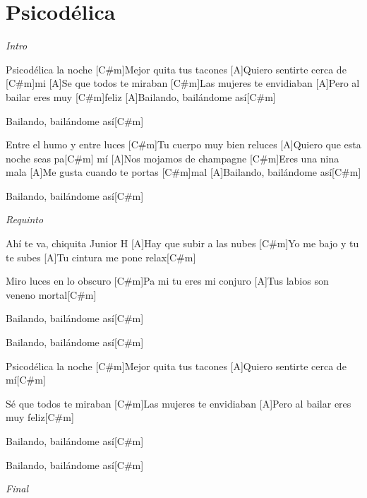 \section{Psicod\'elica}

\noindent
\vspace{1cm}

\begin{guitar}
	\begin{multicols}{2}
		\textit{Intro} \par
		[A]Psicodélica la noche
		[C#m]Mejor quita tus tacones
		[A]Quiero sentirte cerca de [C#m]mi
		[A]Se que todos te miraban
		[C#m]Las mujeres te envidiaban
		[A]Pero al bailar eres muy [C#m]feliz
		[A]Bailando, bailándome así[C#m] \par
		[A]Bailando, bailándome así[C#m] \par
		[A]Entre el humo y entre luces
		[C#m]Tu cuerpo muy bien reluces
		[A]Quiero que esta noche seas pa[C#m] mí
		[A]Nos mojamos de champagne
		[C#m]Eres una nina mala
		[A]Me gusta cuando te portas [C#m]mal
		[A]Bailando, bailándome así[C#m] \par
		[Bm]Bailando, bailándome así[C#m] \par
		\par
		\textit{Requinto}

		Ahí te va, chiquita
		Junior H
		[A]Hay que subir a las nubes
		[C#m]Yo me bajo y tu te subes
		[A]Tu cintura me pone relax[C#m] \par
		[A]Miro luces en lo obscuro
		[C#m]Pa mi tu eres mi conjuro
		[A]Tus labios son veneno mortal[C#m] \par
		[A]Bailando, bailándome así[C#m] \par
		[A]Bailando, bailándome así[C#m] \par
		[A]Psicodélica la noche
		[C#m]Mejor quita tus tacones
		[A]Quiero sentirte cerca de mí[C#m] \par
		[A]Sé que todos te miraban
		[C#m]Las mujeres te envidiaban
		[A]Pero al bailar eres muy feliz[C#m] \par
		[A]Bailando, bailándome así[C#m] \par
		[A]Bailando, bailándome así[C#m] \par
		\par
		\textit{Final}
	\end{multicols}
\end{guitar}

